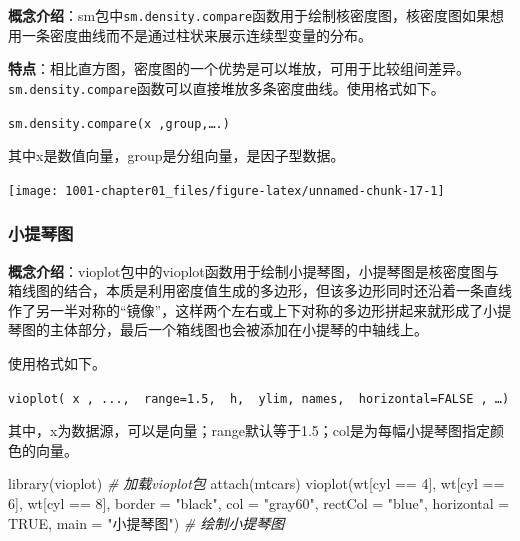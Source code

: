 \documentclass[
]{book}
\newenvironment{Shaded}{\begin{snugshade}}{\end{snugshade}}
\newcommand{\AttributeTok}[1]{\textcolor[rgb]{0.77,0.63,0.00}{#1}}
\newcommand{\CommentTok}[1]{\textcolor[rgb]{0.56,0.35,0.01}{\textit{#1}}}
\newcommand{\ConstantTok}[1]{\textcolor[rgb]{0.00,0.00,0.00}{#1}}
\newcommand{\DecValTok}[1]{\textcolor[rgb]{0.00,0.00,0.81}{#1}}
\newcommand{\FunctionTok}[1]{\textcolor[rgb]{0.00,0.00,0.00}{#1}}
\newcommand{\NormalTok}[1]{#1}
\newcommand{\SpecialCharTok}[1]{\textcolor[rgb]{0.00,0.00,0.00}{#1}}
\newcommand{\StringTok}[1]{\textcolor[rgb]{0.31,0.60,0.02}{#1}}
\begin{document}
\textbf{概念介绍}：sm包中\texttt{sm.density.compare}函数用于绘制核密度图，核密度图如果想用一条密度曲线而不是通过柱状来展示连续型变量的分布。

\textbf{特点}：相比直方图，密度图的一个优势是可以堆放，可用于比较组间差异。\texttt{sm.density.compare}函数可以直接堆放多条密度曲线。使用格式如下。

\texttt{sm.density.compare(x\ ,group,….)}

其中x是数值向量，group是分组向量，是因子型数据。

\begin{Shaded}
\end{Shaded}

\begin{center}\texttt{[image: 1001-chapter01\_files/figure-latex/unnamed-chunk-17-1]} \end{center}

\hypertarget{ux5c0fux63d0ux7434ux56fe}{%
\subsubsection{小提琴图}\label{ux5c0fux63d0ux7434ux56fe}}

\textbf{概念介绍}：vioplot包中的vioplot函数用于绘制小提琴图，小提琴图是核密度图与箱线图的结合，本质是利用密度值生成的多边形，但该多边形同时还沿着一条直线作了另一半对称的``镜像''，这样两个左右或上下对称的多边形拼起来就形成了小提琴图的主体部分，最后一个箱线图也会被添加在小提琴的中轴线上。

使用格式如下。

\texttt{vioplot(\ x\ ,\ ...,\ \ range=1.5,\ \ h,\ \ ylim,\ names,\ \ horizontal=FALSE\ ,\ …)}

其中，x为数据源，可以是向量；range默认等于1.5；col是为每幅小提琴图指定颜色的向量。

\begin{Shaded}
\begin{Highlighting}[]
\FunctionTok{library}\NormalTok{(vioplot)  }\CommentTok{\# 加载vioplot包}
\FunctionTok{attach}\NormalTok{(mtcars)}
\FunctionTok{vioplot}\NormalTok{(wt[cyl }\SpecialCharTok{==} \DecValTok{4}\NormalTok{], wt[cyl }\SpecialCharTok{==} \DecValTok{6}\NormalTok{], wt[cyl }\SpecialCharTok{==} \DecValTok{8}\NormalTok{], }\AttributeTok{border =} \StringTok{"black"}\NormalTok{, }\AttributeTok{col =} \StringTok{"gray60"}\NormalTok{, }
    \AttributeTok{rectCol =} \StringTok{"blue"}\NormalTok{, }\AttributeTok{horizontal =} \ConstantTok{TRUE}\NormalTok{, }\AttributeTok{main =} \StringTok{"小提琴图"}\NormalTok{)  }\CommentTok{\# 绘制小提琴图}
\end{Highlighting}
\end{Shaded}
\end{document}
